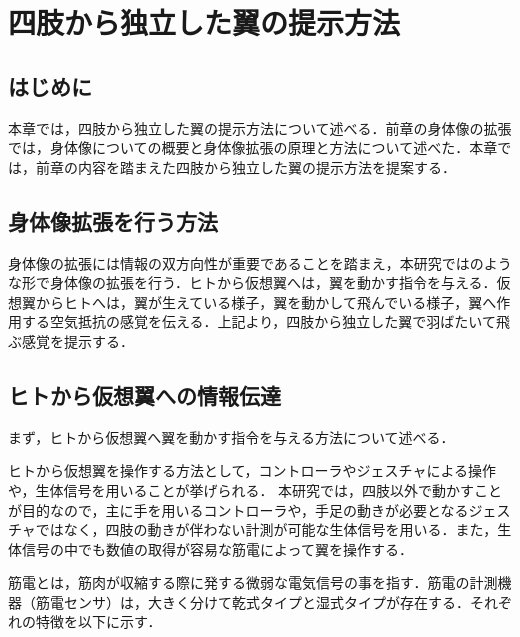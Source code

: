 \chapter[四肢から独立した翼の提示方法]%
        {四肢から独立した翼の提示方法}

\section{はじめに}
    本章では，四肢から独立した翼の提示方法について述べる．前章の身体像の拡張では，身体像についての概要と身体像拡張の原理と方法について述べた．本章では，前章の内容を踏まえた四肢から独立した翼の提示方法を提案する．


\section{身体像拡張を行う方法}
    身体像の拡張には情報の双方向性が重要であることを踏まえ，本研究ではのような形で身体像の拡張を行う．ヒトから仮想翼へは，翼を動かす指令を与える．仮想翼からヒトへは，翼が生えている様子，翼を動かして飛んでいる様子，翼へ作用する空気抵抗の感覚を伝える．上記より，四肢から独立した翼で羽ばたいて飛ぶ感覚を提示する．
    
\section{ヒトから仮想翼への情報伝達}
    まず，ヒトから仮想翼へ翼を動かす指令を与える方法について述べる．

    ヒトから仮想翼を操作する方法として，コントローラやジェスチャによる操作や，生体信号を用いることが挙げられる．
    本研究では，四肢以外で動かすことが目的なので，主に手を用いるコントローラや，手足の動きが必要となるジェスチャではなく，四肢の動きが伴わない計測が可能な生体信号を用いる．また，生体信号の中でも数値の取得が容易な筋電によって翼を操作する．
    
    筋電とは，筋肉が収縮する際に発する微弱な電気信号の事を指す．筋電の計測機器（筋電センサ）は，大きく分けて乾式タイプと湿式タイプが存在する．それぞれの特徴を以下に示す．

